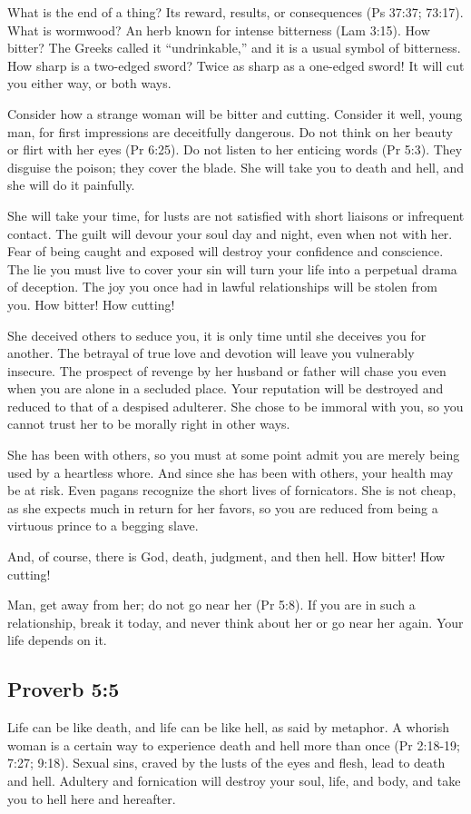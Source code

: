 What is the end of a thing? Its reward, results, or consequences (Ps 37:37; 73:17). What is wormwood? An herb known for intense bitterness (Lam 3:15). How bitter? The Greeks called it “undrinkable,” and it is a usual symbol of bitterness. How sharp is a two-edged sword? Twice as sharp as a one-edged sword! It will cut you either way, or both ways.

Consider how a strange woman will be bitter and cutting. Consider it well, young man, for first impressions are deceitfully dangerous. Do not think on her beauty or flirt with her eyes (Pr 6:25). Do not listen to her enticing words (Pr 5:3). They disguise the poison; they cover the blade. She will take you to death and hell, and she will do it painfully.

She will take your time, for lusts are not satisfied with short liaisons or infrequent contact. The guilt will devour your soul day and night, even when not with her. Fear of being caught and exposed will destroy your confidence and conscience. The lie you must live to cover your sin will turn your life into a perpetual drama of deception. The joy you once had in lawful relationships will be stolen from you. How bitter! How cutting!

She deceived others to seduce you, it is only time until she deceives you for another. The betrayal of true love and devotion will leave you vulnerably insecure. The prospect of revenge by her husband or father will chase you even when you are alone in a secluded place. Your reputation will be destroyed and reduced to that of a despised adulterer. She chose to be immoral with you, so you cannot trust her to be morally right in other ways. 

She has been with others, so you must at some point admit you are merely being used by a heartless whore. And since she has been with others, your health may be at risk. Even pagans recognize the short lives of fornicators. She is not cheap, as she expects much in return for her favors, so you are reduced from being a virtuous prince to a begging slave.

And, of course, there is God, death, judgment, and then hell. How bitter! How cutting!

Man, get away from her; do not go near her (Pr 5:8). If you are in such a relationship, break it today, and never think about her or go near her again. Your life depends on it.

\subsection{Proverb 5:5}
Life can be like death, and life can be like hell, as said by metaphor. A whorish woman is a certain way to experience death and hell more than once (Pr 2:18-19; 7:27; 9:18). Sexual sins, craved by the lusts of the eyes and flesh, lead to death and hell. Adultery and fornication will destroy your soul, life, and body, and take you to hell here and hereafter.

